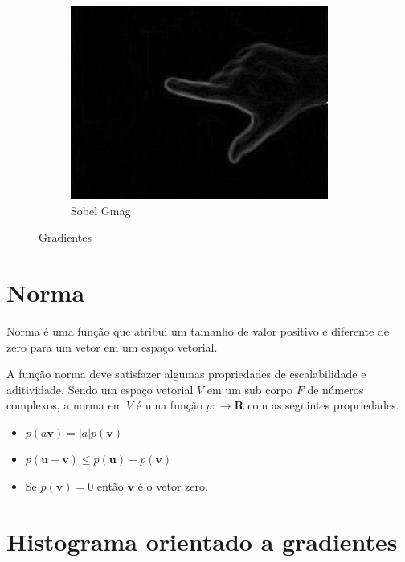 \begin{figure}
    \begin{subfigure}[b]{0.3\textwidth}
        \includegraphics[width=\textwidth]{image/gradiente_sobel_mag.jpg}
        \caption{Sobel Gmag}
        \label{fig:gradiente_gmag}
    \end{subfigure}
    \caption{Gradientes}\label{fig:gradientes}
\end{figure}

\section{Norma}

Norma é uma função que atribui um tamanho de valor positivo e diferente de zero para um vetor em um espaço vetorial.

A função norma deve satisfazer algumas propriedades de escalabilidade e aditividade.
Sendo um espaço vetorial \(V\) em um sub corpo \(F\) de números complexos, a norma em \(V\) é uma função \(p:\rightarrow \mathbf{R}\) com as seguintes propriedades.

\begin{itemize}
\item \( p(a\mathbf{v}) = |a|p(\mathbf{v}) \)
\item \( p(\mathbf{u + v}) \leq p(\mathbf{u}) + p(\mathbf{v}) \)
\item Se \( p(\mathbf{v}) = 0 \) então \(\mathbf{v}\) é o vetor zero.
\end{itemize}


\section{Histograma orientado a gradientes}

